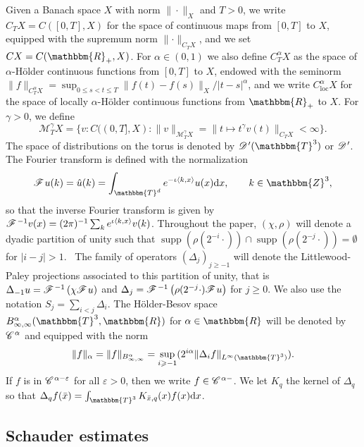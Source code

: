\documentclass[a4paper,11pt]{article}
\newcommand{\cdummy}{\cdot}
\newcommand{\mathd}{\mathrm{d}}
\newcommand{\nosymbol}{}
\newcommand{\tmop}[1]{\ensuremath{\operatorname{#1}}}
\newcommand{\CC}{\mathscr{C} \hspace{.1em}}
\newcommand{\CF}{\mathscr{F} \hspace{.1em}}
\newcommand{\DD}{\mathscr{D} \hspace{.1em}}
\begin{document}
Given a Banach space $X$ with norm $\| \cdummy \|_X$ and $T > 0$, we write
$C_T X = C ([0, T], X)$ for the space of continuous maps from $[0, T]$ to $X$,
equipped with the supremum norm $\lVert \cdummy \rVert_{C_T X}$, and we set $C
X = C (\mathbbm{R}_+, X)$. For $\alpha \in (0, 1)$ we also define
$C^{\alpha}_T X$ as the space of $\alpha$-H{\"o}lder continuous functions from
$[0, T]$ to $X$, endowed with the seminorm $\|f\|_{C^{\alpha}_T X} = \sup_{0
\leqslant s < t \leqslant T} \|f (t) - f (s)\|_X / |t - s|^{\alpha}$, and we
write $C^{\alpha}_{\tmop{loc}} X$ for the space of locally $\alpha$-H{\"o}lder
continuous functions from $\mathbbm{R}_+$ to $X$. For $\gamma > 0$, we define
\[ \mathcal{M}^{\gamma}_T X = \{ v : C ((0, T], X) : \| v
   \|_{\mathcal{M}^{\gamma}_T X} = \| t \mapsto t^{\gamma} v (t) \|_{C_T X} <
   \infty \} . \]
The space of distributions on the torus is denoted by $\DD' (\mathbbm{T}^3)$
or $\DD'$. The Fourier transform is defined with the normalization
\[ \CF u (k) = \hat{u} (k) = \int_{\mathbbm{T}^d} e^{- \iota \langle k, x
   \rangle} u (x) \mathd x, \qquad k \in \mathbbm{Z}^3, \]
so that the inverse Fourier transform is given by $\CF^{- 1} v (x) = (2
\pi)^{- 1} \sum_k e^{\iota \langle k, x \rangle} v (k)$. Throughout the paper,
$(\chi, \rho)$ will denote a dyadic partition of unity such that $\tmop{supp}
(\rho (2^{- i} \cdummy)) \cap \tmop{supp} (\rho (2^{- j} \cdummy)) =
\emptyset$ for $|i - j| > 1$. \ The family of operators $(\Delta_j)_{j \ge -
1}$ will denote the Littlewood-Paley projections associated to this partition
of unity, that is $\Delta_{- 1} u = \CF^{- 1} \left( \chi \CF u \right)$ and
$\Delta_j = \CF^{- 1} \left( \rho (2^{- j} \nosymbol \cdummy) \CF u \right)$
for $j \ge 0$. We also use the notation $S_j = \sum_{i < j} \Delta_i$. The
H{\"o}lder-Besov space $B^{\alpha}_{\infty, \infty} (\mathbbm{T}^3,
\mathbbm{R})$ for $\alpha \in \mathbbm{R}$ will be denoted by $\CC^{\alpha}$
and equipped with the norm
\[ \lVert f \rVert_{\alpha} = \lVert f \rVert_{B^{\alpha}_{\infty, \infty}} =
   \sup_{i \geqslant - 1} (2^{i \alpha} \| \Delta_i f \|_{L^{\infty}
   (\mathbbm{T}^3)}) . \]
If $f$ is in $\CC^{\alpha - \varepsilon}$ for all $\varepsilon > 0$, then we
write $f \in \CC^{\alpha -}$. We let $K_q$ the kernel of $\Delta_q$ so that
$\Delta_q f (\bar{x}) = \int_{\mathbbm{T}^3} K_{\bar{x}, q} (x) f (x) \mathd
x$.

\subsection{Schauder estimates}
\end{document}
